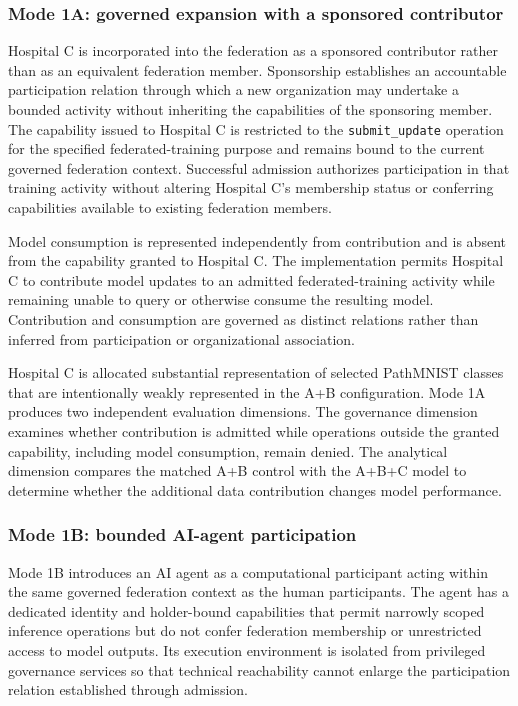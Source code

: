 \documentclass[twoside,11pt]{article}
\begin{document}
\subsubsection{Mode 1A: governed expansion with a sponsored contributor}
Hospital C is incorporated into the federation as a sponsored contributor rather than as an equivalent federation member. Sponsorship establishes an accountable participation relation through which a new organization may undertake a bounded activity without inheriting the capabilities of the sponsoring member. The capability issued to Hospital C is restricted to the \texttt{submit\_update} operation for the specified federated-training purpose and remains bound to the current governed federation context. Successful admission authorizes participation in that training activity without altering Hospital C's membership status or conferring capabilities available to existing federation members.

Model consumption is represented independently from contribution and is absent from the capability granted to Hospital C. The implementation  permits Hospital C to contribute model updates to an admitted federated-training activity while remaining unable to query or otherwise consume the resulting model. Contribution and consumption are   governed as distinct relations rather than inferred from participation or organizational association.

Hospital C is allocated substantial representation of selected PathMNIST classes that are intentionally weakly represented in the A+B configuration. Mode 1A   produces two independent evaluation dimensions. The governance dimension examines whether contribution is admitted while operations outside the granted capability, including model consumption, remain denied. The analytical dimension compares the matched A+B control with the A+B+C model to determine whether the additional data contribution changes model performance.

 \subsubsection{Mode 1B: bounded AI-agent participation}
Mode 1B introduces an AI agent as a computational participant acting within the same governed federation context as the human participants. The agent has a dedicated identity and holder-bound capabilities that permit narrowly scoped inference operations but do not confer federation membership or unrestricted access to model outputs. Its execution environment is isolated from privileged governance services so that technical reachability cannot enlarge the participation relation established through admission.
\end{document}
